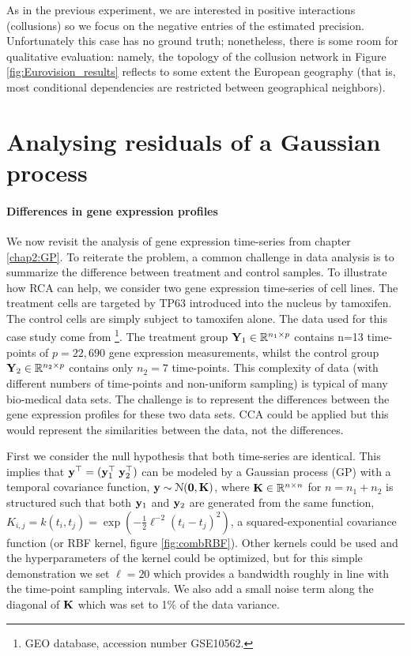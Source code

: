         As in the previous experiment, we are interested in positive interactions (collusions) so we focus on the negative entries of the estimated precision. Unfortunately this case has no ground truth; nonetheless, there is some room for qualitative evaluation: namely, the topology of the collusion network in Figure \ref{fig:Eurovision_results} reflects to some extent the European geography (that is, most conditional dependencies are restricted between geographical neighbors).




  \section{Analysing residuals of a Gaussian process} \label{sec:chap5_GEdifferences}   
    
    \paragraph{Differences in gene expression profiles}  
    We now revisit the analysis of gene expression time-series from chapter \ref{chap2:GP}.
    To reiterate the problem, a common challenge in data analysis is to summarize the difference between treatment and control samples. To illustrate how RCA can help, we consider two gene expression time-series of cell lines.
    The treatment cells are targeted by TP63 introduced into the nucleus by tamoxifen. The control cells are simply subject to tamoxifen alone.
    The data used for this case study come from \citep{della2008direct}\footnote{GEO database, accession number GSE10562.}.
    The treatment group $\mathbf{Y}_1 \in \mathbb{R}^{n_1\times p}$ contains n=13 time-points of $p=22,690$ gene expression measurements, whilst the control group $\mathbf{Y}_2 \in \mathbb{R}^{n_2 \times p}$ contains only $n_2=7$ time-points.
    This complexity of data (with different numbers of time-points and non-uniform sampling) is typical of many bio-medical data sets.
    The challenge is to represent the differences between the gene expression profiles for these two data sets.
    CCA could be applied but this would represent the similarities between the data, not the differences.
 
    First we consider the null hypothesis that both time-series are identical.
    This implies that $\mathbf{y}^\top = (\mathbf{y}^\top_1 \; \mathbf{y}^\top_2)$ can be modeled by a Gaussian process (GP) with a temporal covariance function, $ \mathbf{y} \sim \mathcal{N}(\mathbf{0}, \mathbf{K})$, where $\mathbf{K} \in \mathbb{R}^{n\times n}$ for $n \!\!=\!\! n_1 \!\!+\!\! n_2$ is structured such that both $\mathbf{y}_1$ and $\mathbf{y}_2$ are generated from the same function, $K_{i, j} = k(t_i, t_j) = \exp(-\tfrac{1}{2}\ell^{-2}(t_i - t_j)^2)$, a squared-exponential covariance function (or RBF kernel, figure \ref{fig:combRBF}).
    Other kernels could be used and the hyperparameters of the kernel could be optimized, but for this simple demonstration we set $\ell=20$ which provides a bandwidth roughly in line with the time-point sampling intervals.
    We also add a small noise term along the diagonal of $\mathbf{K}$ which was set to 1\% of the data variance.
 
